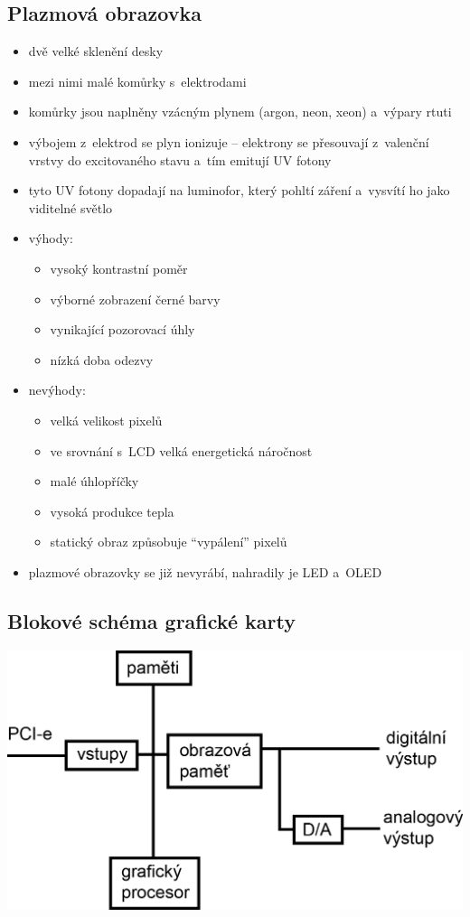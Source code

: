 \documentclass[a4paper,12pt]{article}
\providecommand{\tightlist}{%
\setlength{\itemsep}{0pt}\setlength{\parskip}{0pt}}
\begin{document}
\subsection{Plazmová obrazovka}

\begin{itemize}
  \tightlist
  \item dvě velké sklenění desky
  \item mezi nimi malé komůrky s~elektrodami
  \item komůrky jsou naplněny vzácným plynem (argon, neon, xeon) a~výpary rtuti
  \item výbojem z~elektrod se plyn ionizuje -- elektrony se přesouvají
  z~valenční vrstvy do excitovaného stavu a~tím emitují UV fotony
  \item tyto UV fotony dopadají na luminofor, který pohltí záření a~vysvítí ho
  jako viditelné světlo

  \item výhody:
  \begin{itemize}
    \tightlist
    \item vysoký kontrastní poměr
    \item výborné zobrazení černé barvy
    \item vynikající pozorovací úhly
    \item nízká doba odezvy
  \end{itemize}

  \item nevýhody:
  \begin{itemize}
    \tightlist
    \item velká velikost pixelů
    \item ve srovnání s~LCD velká energetická náročnost
    \item malé úhlopříčky
    \item vysoká produkce tepla
    \item statický obraz způsobuje ``vypálení'' pixelů
  \end{itemize}

  \item plazmové obrazovky se již nevyrábí, nahradily je LED a~OLED
\end{itemize}

\subsection{Blokové schéma grafické karty}

\includegraphics{ref/blokove-schema-graficke-karty.png}
\end{document}
